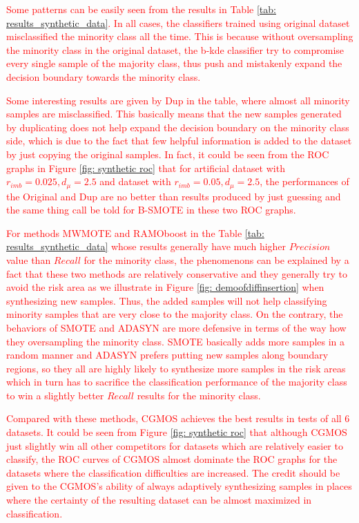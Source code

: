 \documentclass[10pt,journal,compsoc]{IEEEtran}
\begin{document}
\textcolor{red}{Some patterns can be easily seen from the results in Table \ref{tab: results_synthetic_data}. In all cases, the classifiers trained using original dataset misclassified the minority class all the time. This is because without oversampling the minority class in the original dataset, the b-kde classifier try to compromise every single sample of the majority class, thus push and mistakenly expand the decision boundary towards the minority class.} 

\textcolor{red}{Some interesting results are given by Dup in the table, where almost all minority samples are misclassified. This basically means that the new samples generated by duplicating does not help expand the decision boundary on the minority class side, which is due to the fact that few helpful information is added to the dataset by just copying the original samples. In fact, it could be seen from the ROC graphs in Figure \ref{fig: synthetic roc} that for artificial dataset with $r_{imb}= 0.025, d_{\mu}=2.5$ and dataset with $r_{imb}=0.05, d_{\mu}=2.5$, the performances of the Original and Dup are no better than results produced by just guessing and the same thing call be told for B-SMOTE in these two ROC graphs. }

\textcolor{red}{For methods MWMOTE and RAMOboost in the Table \ref{tab: results_synthetic_data} whose results generally have much higher $Precision$ value than $Recall$ for the minority class, the phenomenons can be explained by a fact that these two methods are relatively conservative and they generally try to avoid the risk area as we illustrate in Figure \ref{fig: demoofdiffinsertion} when synthesizing new samples. Thus, the added samples will not help classifying minority samples that are very close to the majority class. On the contrary, the behaviors of SMOTE and ADASYN are more defensive in terms of the way how they oversampling the minority class. SMOTE basically adds more samples in a random manner and ADASYN prefers putting new samples along boundary regions, so they all are highly likely to synthesize more samples in the risk areas which in turn has to sacrifice the classification performance of the majority class to win a slightly better $Recall$ results for the minority class.} 

\textcolor{red}{Compared with these methods, CGMOS achieves the best results in tests of all 6 datasets. It could be seen from Figure \ref{fig: synthetic roc} that although CGMOS just slightly win all other competitors for datasets which are relatively easier to classify, the ROC curves of CGMOS almost dominate the ROC graphs for the datasets where the classification difficulties are increased. The credit should be given to the CGMOS's ability of always adaptively synthesizing samples in places where the certainty of the resulting dataset can be almost maximized in classification.}
\end{document}
